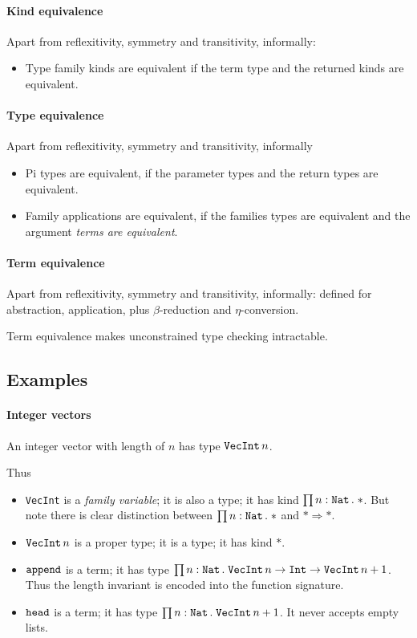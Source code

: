 \documentclass{article}
\newcommand{\TNat}{\text{\texttt{Nat}}}
\begin{document}
\paragraph{Kind equivalence}
  Apart from reflexitivity, symmetry and transitivity, informally:
  \begin{itemize}
    \item Type family kinds are equivalent if the term type and the returned kinds are equivalent.
  \end{itemize}

\paragraph{Type equivalence}
  Apart from reflexitivity, symmetry and transitivity, informally
  \begin{itemize}
    \item Pi types are equivalent, if the parameter types and the return types are equivalent.
    \item Family applications are equivalent, if the families types are equivalent and the argument \emph{terms are equivalent}.
  \end{itemize}

\paragraph{Term equivalence}
  Apart from reflexitivity, symmetry and transitivity, informally:
  defined for abstraction, application, plus $\beta$-reduction and $\eta$-conversion.

  Term equivalence makes unconstrained type checking intractable.

\subsection{Examples}
\paragraph{Integer vectors}
  An integer vector with length of $n$ has type $\text{\texttt{VecInt}}\, n$.

  Thus
  \begin{itemize}
    \item \texttt{VecInt} is a \emph{family variable}; it is also a type; it has kind $\prod n:\TNat\, .\; *$.
      But note there is clear distinction between $\prod n:\TNat\, .\;*$ and $* \Rightarrow *$.
    \item $\text{\texttt{VecInt}}\, n$ is a proper type; it is a type; it has kind $*$.
    \item $\text{\texttt{append}}$ is a term; it has type $\prod n:\TNat\, .\; \text{\texttt{VecInt}}\, n \to \text{\texttt{Int}} \to \text{\texttt{VecInt}}\, n+1$.
      Thus the length invariant is encoded into the function signature.
    \item $\text{\texttt{head}}$ is a term; it has type $\prod n:\TNat\, .\;\text{\texttt{VecInt}}\, n+1$.
      It never accepts empty lists.
  \end{itemize}
\end{document}
